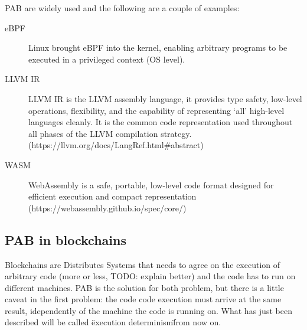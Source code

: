 \documentclass[../main.tex]{subfiles}
\begin{document}
PAB are widely used and the following are a couple of examples:

\begin{description}
  \item[eBPF]
  Linux brought eBPF into the kernel, enabling arbitrary programs to be executed in a privileged context (OS level).
  \item[LLVM IR]
  LLVM IR is the LLVM assembly language, it provides type safety, low-level operations, flexibility, and the capability of representing ‘all’ high-level languages cleanly. It is the common code representation used throughout all phases of the LLVM compilation strategy. (https://llvm.org/docs/LangRef.html\#abstract)
  \item[WASM]
  WebAssembly is a safe, portable, low-level code format designed for efficient execution and compact representation (https://webassembly.github.io/spec/core/)
\end{description}

\subsection{PAB in blockchains}

Blockchains are Distributes Systems that needs to agree on the execution of arbitrary code (more or less, TODO: explain better) and the code has to run on different machines. PAB is the solution for both problem, but there is a little caveat in the first problem: the code code execution must arrive at the same result, idependently of the machine the code is running on. What has just been described will be called \"execution determinism\" from now on.
\end{document}
